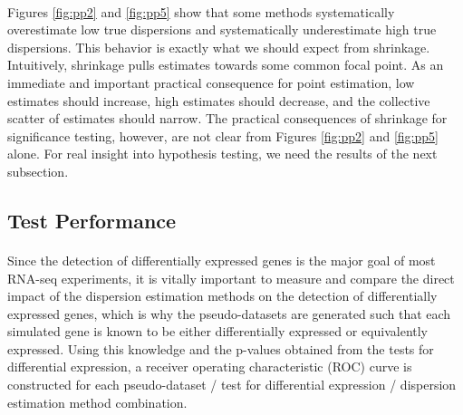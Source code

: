 \documentclass[10pt]{article}
\begin{document}
{
\paragraph{} \indent Figures \ref{fig:pp2} and \ref{fig:pp5} show that some methods systematically overestimate low true dispersions and systematically underestimate high true dispersions. This behavior is exactly what we should expect from shrinkage. Intuitively, shrinkage pulls estimates towards some common focal point. As an immediate and important practical consequence for point estimation, low estimates should increase, high estimates should decrease, and the collective scatter of estimates should narrow. The practical consequences of shrinkage for significance testing, however, are not clear from Figures \ref{fig:pp2} and \ref{fig:pp5} alone. For real insight into hypothesis testing, we need the results of the next subsection.}


\subsection*{Test Performance} \label{subsec:test}

\paragraph{} \indent Since the detection of differentially expressed genes is the major goal of most RNA-seq experiments, it is vitally important to measure and compare the direct impact of the dispersion estimation methods on the detection of differentially expressed genes, %
 which is why the pseudo-datasets are generated such that each simulated gene is known to be either differentially expressed 
 or equivalently expressed. %
  Using this knowledge and the p-values obtained from the tests for differential expression, a receiver operating characteristic (ROC) curve is constructed for each pseudo-dataset / test for differential expression %
  / dispersion estimation method combination. %
  
\end{document}
